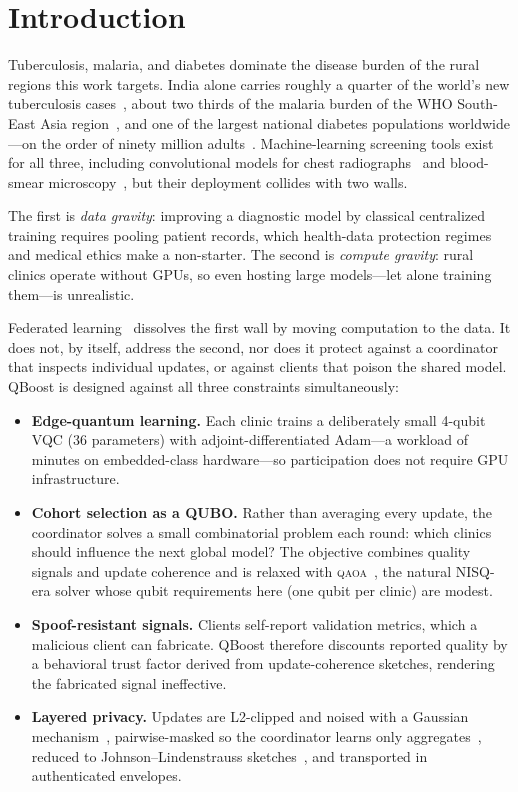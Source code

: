 \documentclass[conference]{IEEEtran}
\newcommand{\qaoa}{\textsc{qaoa}}
\begin{document}
\section{Introduction}
Tuberculosis, malaria, and diabetes dominate the disease burden of the rural
regions this work targets. India alone carries roughly a quarter of the
world's new tuberculosis cases~\cite{who_tb}, about two thirds of the malaria
burden of the WHO South-East Asia region~\cite{who_malaria}, and one of the
largest national diabetes populations worldwide---on the order of ninety
million adults~\cite{idf}. Machine-learning screening tools exist for all
three, including convolutional models for chest radiographs~\cite{wang_cxr}
and blood-smear microscopy~\cite{rajaraman}, but their deployment collides
with two walls.

The first is \emph{data gravity}: improving a diagnostic model by classical
centralized training requires pooling patient records, which health-data
protection regimes and medical ethics make a non-starter. The second is
\emph{compute gravity}: rural clinics operate without GPUs, so even hosting
large models---let alone training them---is unrealistic.

Federated learning~\cite{mcmahan,kairouz} dissolves the first wall by moving
computation to the data. It does not, by itself, address the second, nor does
it protect against a coordinator that inspects individual updates, or against
clients that poison the shared model. QBoost is designed against all three
constraints simultaneously:

\begin{itemize}
\item \textbf{Edge-quantum learning.} Each clinic trains a deliberately small
4-qubit VQC (36 parameters) with adjoint-differentiated Adam---a workload of
minutes on embedded-class hardware---so participation does not require GPU
infrastructure.
\item \textbf{Cohort selection as a QUBO.} Rather than averaging every update,
the coordinator solves a small combinatorial problem each round: which clinics
should influence the next global model? The objective combines quality signals
and update coherence and is relaxed with \qaoa{}~\cite{farhi}, the natural
NISQ-era solver whose qubit requirements here (one qubit per clinic) are
modest.
\item \textbf{Spoof-resistant signals.} Clients self-report validation
metrics, which a malicious client can fabricate. QBoost therefore discounts
reported quality by a behavioral trust factor derived from
update-coherence sketches, rendering the fabricated signal ineffective.
\item \textbf{Layered privacy.} Updates are L2-clipped and noised with a
Gaussian mechanism~\cite{abadi,dwork}, pairwise-masked so the coordinator
learns only aggregates~\cite{bonawitz}, reduced to Johnson--Lindenstrauss
sketches~\cite{jl}, and transported in authenticated envelopes.
\end{itemize}
\end{document}
